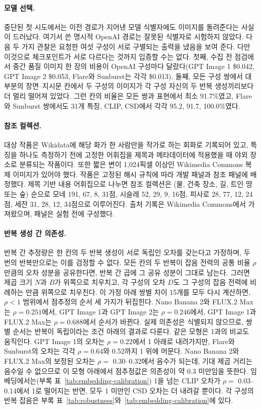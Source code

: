 \paragraph{모델 선택.} 중단된 첫 시도에서는 이전 경로가 지어낸 모델 식별자에도 이미지를 돌려준다는
사실이 드러났다. 여기서 쓴 명시적 OpenAI 경로는 잘못된 식별자로 시험하지 않았다. 다음 두 가지 관찰은
요청한 여섯 구성이 서로 구별되는 출력을 냈음을 보여 준다. 다만 이것으로 체크포인트가 서로 다르다는 것까지
입증할 수는 없다. 첫째, 수집 전 점검에서 중간 품질 이미지 한 장의 비용이 OpenAI 구성마다 달랐다(GPT
Image 1 \$0.042, GPT Image 2 \$0.053, Flare와 Sunburst는 각각 \$0.013). 둘째, 모든 구성 쌍에서 대부분의
장면--지시문 칸에서 두 구성의 이미지가 각 구성 자신의 두 반복 생성끼리보다 더 멀리 떨어져 있었다. 그런
칸의 비율은 모든 쌍과 표현에서 최소 91.7\%였고, Flare와 Sunburst 쌍에서도 31개 특징, CLIP, CSD에서
각각 95.2, 91.7, 100.0\%였다.

\paragraph{참조 컬렉션.}
대상 작품은 Wikidata에 해당 화가 한 사람만을 작가로 하는 회화로 기록되어 있고, 특징을 하나도 측정하기
전에 고정한 어휘집을 제목과 메타데이터에 적용했을 때 야외 장소로 분류되는 작품이다. 또한 짧은 변이
1,024픽셀 이상인 Wikimedia Commons 복제 이미지가 있어야 했다. 작품은 고정된 해시 규칙에 따라 개발
패널과 참조 패널에 배정했다. 제목 기반 내용 어휘집으로 나누면 참조 컬렉션은 (물, 건축 장소, 길, 트인
땅 또는 숲) 순으로 모네 191, 67, 8, 31점, 시슬레 52, 29, 9, 16점, 피사로 28, 77, 12, 24점, 세잔 31,
28, 12, 34점으로 이루어진다. 출처 기록은 Wikimedia Commons에서 가져왔으며\citep{wikimediacommons},
패널은 실험 전에 구성했다.

\paragraph{반복 생성 간 의존성.}
반복 간 추정량은 한 칸의 두 반복 생성이 서로 독립인 오차를 갖는다고 가정하며, 두 번의 반복만으로는 이를
검정할 수 없다. 모든 칸의 두 반복이 잡음 전력의 공통 비율 $\rho$만큼의 오차 성분을 공유한다면, 반복 간
곱에 그 공유 성분이 그대로 남는다. 그러면 제곱 크기 $N$과 $B$가 위쪽으로 치우치고, 각 구성의 오차 $D$도
그 구성의 잡음 전력에 비례하는 만큼 위쪽으로 치우친다. 이 가정 아래 쌍별 차이 15개를 모두 다시 계산하면,
$\rho<1$ 범위에서 점추정의 순서 세 가지가 뒤집힌다. Nano Banana 2와 FLUX.2 Max는 $\rho=0.251$에서,
GPT Image 1과 GPT Image 2는 $\rho=0.246$에서, GPT Image 1과 FLUX.2 Max는 $\rho=0.688$에서 순서가
바뀐다. 실제 의존성은 식별되지 않으므로, 쌍별 순서는 반복이 독립이라는 조건 아래의 결과로 다룬다. 같은
모형은 1과의 비교도 움직인다. GPT Image 1의 오차는 $\rho=0.22$에서 1 아래로 내려가지만, Flare와
Sunburst의 오차는 각각 $\rho=0.64$와 0.52까지 1 위에 머문다. Nano Banana 2와 FLUX.2 Max의 보정된
오차는 $\rho=$ 0.30--0.32에서 음수가 되는데, 기대 제곱 거리는 음수일 수 없으므로 이 모형 아래에서
점추정값은 의존성이 약 0.3 미만임을 뜻한다. 임베딩에서는(부록 표~\ref{tab:embedding-calibration}) 1을
넘는 CLIP 오차가 $\rho=$ 0.03--0.14에서 1로 떨어지는 반면, 모두 1 미만인 CSD 오차는 더 내려갈 뿐이다.
각 구성의 반복 잡음은 부록 표~\ref{tab:robustness}와~\ref{tab:embedding-calibration}에 있다.

